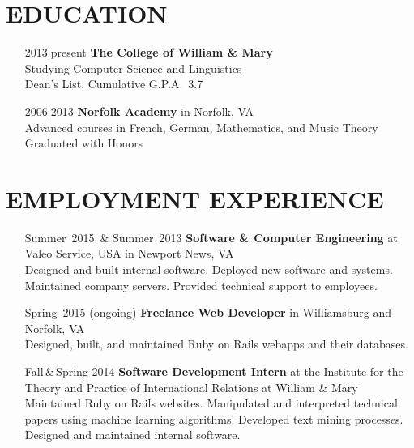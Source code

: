 \documentclass{res}     %
\begin{document}
\begin{resume}

\section{EDUCATION}          
\vspace{5mm}
\begin{itemize}[font=\itshape,align=parleft,labelwidth=3cm,leftmargin=2cm]
    \item[2013|present]
        \textbf{The College of William \& Mary}
        \\ Studying Computer Science and Linguistics %
        \\ Dean's List, Cumulative G.P.A.\ 3.7
    \item[2006|2013]
        \textbf{Norfolk Academy} in Norfolk, VA
        \\ Advanced courses in French, German, Mathematics, and Music Theory
        \\ Graduated with Honors
\end{itemize}

\section{EMPLOYMENT EXPERIENCE}
\vspace{5mm}
\begin{itemize}[font=\itshape,align=parleft,labelwidth=3cm,leftmargin=2cm]
    \item[Summer~2015~\& Summer~2013]
        \textbf{Software \& Computer Engineering}
        at Valeo Service, USA
        in Newport News, VA
        \vspace{1mm} \\
        Designed and built internal software.
        Deployed new software and systems.
        Maintained company servers.
        Provided technical support to employees.
    \item[Spring~2015 (ongoing)]
        \textbf{Freelance Web Developer}
        in Williamsburg and Norfolk, VA
        \vspace{1mm} \\
        Designed, built, and maintained Ruby on Rails webapps and their databases.
    \item[Fall\,\&\,Spring 2014]
        \textbf{Software Development Intern}
        at the Institute for the Theory and Practice of International Relations
        at William \& Mary
        \vspace{1mm} \\
        Maintained Ruby on Rails websites.
        Manipulated and interpreted technical papers using machine learning algorithms.
        Developed text mining processes.
        Designed and maintained internal software.
\end{itemize}


\end{resume}
\end{document}
